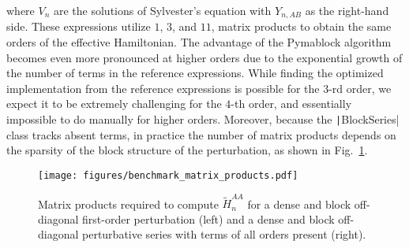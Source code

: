 where $V_{n}$ are the solutions of Sylvester's equation with $Y_{n,AB}$ as the right-hand side.
These expressions utilize $1$, $3$, and $11$, matrix products to obtain the same orders of the effective Hamiltonian.
The advantage of the Pymablock algorithm becomes even more pronounced at higher orders due to the exponential growth of the number of terms in the reference expressions.
While finding the optimized implementation from the reference expressions is possible for the $3$-rd order, we expect it to be extremely challenging for the $4$-th order, and essentially impossible to do manually for higher orders.
Moreover, because the \texttt|BlockSeries| class tracks absent terms, in practice the number of matrix products depends on the sparsity of the block structure of the perturbation, as shown in Fig.~\ref{fig:benchmark_matrix_products}.
%
\begin{figure}[h]
    \centering
    \texttt{[image: figures/benchmark\_matrix\_products.pdf]}
    \caption{
        Matrix products required to compute $\tilde{H}^{AA}_{n}$ for
        a dense and block off-diagonal first-order perturbation (left) and a dense and block off-diagonal perturbative series with terms of all orders present (right).
        }
    \label{fig:benchmark_matrix_products}
\end{figure}
%

